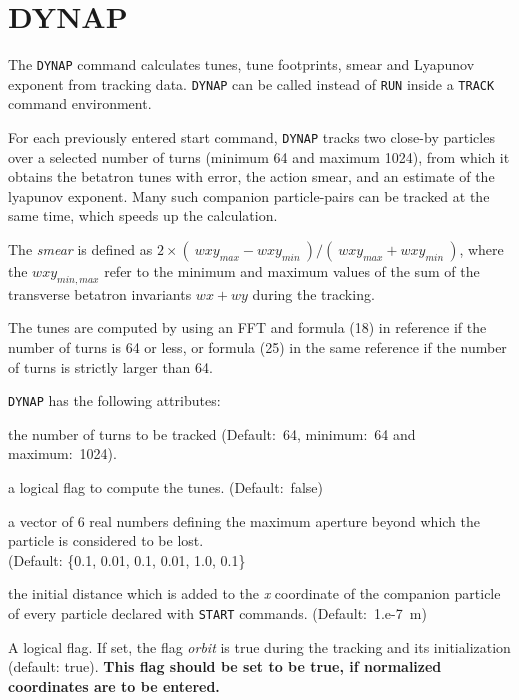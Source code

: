 
\section{DYNAP}

The {\tt DYNAP} command calculates tunes, tune footprints, smear and
Lyapunov exponent from tracking data. {\tt DYNAP} can be called
instead of {\tt RUN} inside a {\tt TRACK} command environment.

 
For each previously entered start command, {\tt DYNAP} tracks two
close-by particles over a selected number of turns (minimum 64 and 
maximum 1024), from which it obtains the betatron tunes with error, 
the action smear, and an estimate of the lyapunov exponent. 
Many such companion particle-pairs can be tracked at the same time,
which speeds up the calculation.

The {\it smear} is defined as  
$2 \times (\ wxy_{max} - wxy_{min}\ ) / (\ wxy_{max} + wxy_{min}\ )$,
where the $wxy_{min,max}$ refer to the  minimum and
maximum values of the sum of the transverse betatron invariants
$wx+wy$ during the tracking. 

The tunes are computed by using an FFT and formula (18) in reference 
\cite{bartolini1995} if the number of turns is 64 or less, or formula (25) in 
the same reference if the number of turns is strictly larger than 64.
 
{\tt DYNAP} has the following attributes: 
\begin{madlist}
    the number of turns to be tracked (Default:~64,
   minimum:~64 and maximum:~1024). 
     
    a logical flag to compute the tunes. (Default:~false)
 
    a vector of 6 real numbers defining the maximum
   aperture beyond which the particle is considered to be lost.\\
   (Default: \{0.1, 0.01, 0.1, 0.01, 1.0, 0.1\}
     
    the initial distance which is added to the
   {\it x} coordinate of the companion particle of every particle
   declared with {\tt START} commands. (Default:~1.e-7~m)
   
    A logical flag. If set, the flag {\it orbit} 
   is true during the tracking and its initialization
   (default: true).
   {\bf This flag should be set to be true, if 
     normalized coordinates are to be entered.}
\end{madlist}

